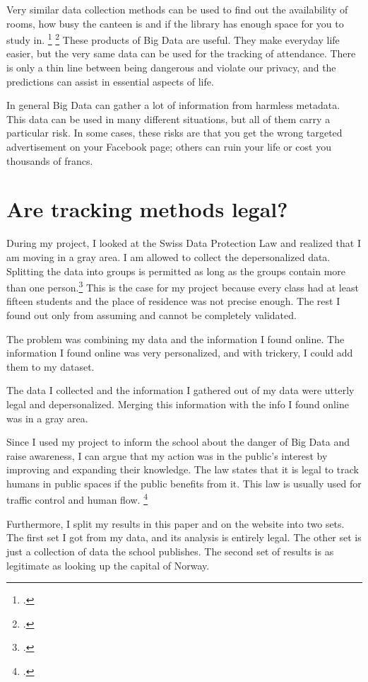 \documentclass[paper=a4, fontsize=11pt]{article}
\begin{document}
Very similar data collection methods can be used to find out the availability of rooms, how busy the canteen is and if the library has enough space for you to study in. \footcite{waitz} \footcite{trackingpublic} These products of Big Data are useful. They make everyday life easier, but the very same data can be used for the tracking of attendance. There is only a thin line between being dangerous and violate our privacy, and the predictions can assist in essential aspects of life.

In general Big Data can gather a lot of information from harmless metadata. This data can be used in many different situations, but all of them carry a particular risk. In some cases, these risks are that you get the wrong targeted advertisement on your Facebook page; others can ruin your life or cost you thousands of francs.

\section{Are tracking methods legal?}
During my project, I looked at the Swiss Data Protection Law and realized that I am moving in a gray area. I am allowed to collect the depersonalized data. Splitting the data into groups is permitted as long as the groups contain more than one person.\footcite{swissdataprotection} This is the case for my project because every class had at least fifteen students and the place of residence was not precise enough. The rest I found out only from assuming and cannot be completely validated.

The problem was combining my data and the information I found online. The information I found online was very personalized, and with trickery, I could add them to my dataset.

The data I collected and the information I gathered out of my data were utterly legal and depersonalized. Merging this information with the info I found online was in a gray area.

Since I used my project to inform the school about the danger of Big Data and raise awareness, I can argue that my action was in the public's interest by improving and expanding their knowledge. The law states that it is legal to track humans in public spaces if the public benefits from it. This law is usually used for traffic control and human flow. \footcite{swissdataprotection}

Furthermore, I split my results in this paper and on the website into two sets. The first set I got from my data, and its analysis is entirely legal. The other set is just a collection of data the school publishes. The second set of results is as legitimate as looking up the capital of Norway.
\end{document}
